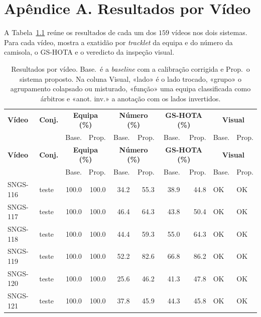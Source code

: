 \chapter{Apêndice A. Resultados por Vídeo}\label{anexo:videos}
\setcounter{table}{0}

A Tabela~\ref{tab:anexo-videos} reúne os resultados de cada um dos $159$ vídeos nos dois sistemas. Para cada vídeo, mostra a exatidão por \emph{tracklet} da equipa e do número da camisola, o GS-HOTA e o veredicto da inspeção visual.


\setlength{\LTcapwidth}{\textwidth}
\begin{small}
\renewcommand{\tablename}{\normalsize Tabela}
\begin{longtable}{|l|l|r|r|r|r|r|r|l|l|}
\caption{\normalsize Resultados por vídeo. Base.\ é a \emph{baseline} com a calibração corrigida e Prop.\ o sistema proposto. Na coluna Visual, «lado» é o lado trocado, «grupo» o agrupamento colapsado ou misturado, «função» uma equipa classificada como árbitros e «anot. inv.» a anotação com os lados invertidos.}\label{tab:anexo-videos}\\
\hline \textbf{Vídeo} & \textbf{Conj.} & \multicolumn{2}{|c|}{\textbf{Equipa (\%)}} & \multicolumn{2}{|c|}{\textbf{Número (\%)}} & \multicolumn{2}{|c|}{\textbf{GS-HOTA (\%)}} & \multicolumn{2}{|c|}{\textbf{Visual}} \\
 & & Base. & Prop. & Base. & Prop. & Base. & Prop. & Base. & Prop. \\ \hline
\endfirsthead
\hline \textbf{Vídeo} & \textbf{Conj.} & \multicolumn{2}{|c|}{\textbf{Equipa (\%)}} & \multicolumn{2}{|c|}{\textbf{Número (\%)}} & \multicolumn{2}{|c|}{\textbf{GS-HOTA (\%)}} & \multicolumn{2}{|c|}{\textbf{Visual}} \\
 & & Base. & Prop. & Base. & Prop. & Base. & Prop. & Base. & Prop. \\ \hline
\endhead
\hline
\endfoot
SNGS-116 & teste & 100.0 & 100.0 & 34.2 & 55.3 & 38.9 & 44.8 & OK & OK \\ \hline
SNGS-117 & teste & 100.0 & 100.0 & 46.4 & 64.3 & 43.8 & 50.4 & OK & OK \\ \hline
SNGS-118 & teste & 100.0 & 100.0 & 44.4 & 59.3 & 55.0 & 64.3 & OK & OK \\ \hline
SNGS-119 & teste & 100.0 & 100.0 & 52.2 & 82.6 & 66.8 & 86.2 & OK & OK \\ \hline
SNGS-120 & teste & 100.0 & 100.0 & 25.6 & 46.2 & 41.3 & 47.8 & OK & OK \\ \hline
SNGS-121 & teste & 100.0 & 100.0 & 37.8 & 45.9 & 44.3 & 45.8 & OK & OK \\ \hline

\end{longtable}
\end{small}

